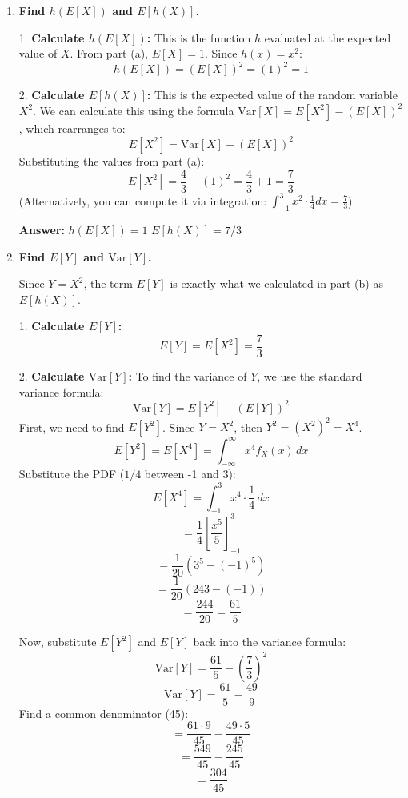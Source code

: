 \documentclass[12pt]{article}
\begin{document}
\begin{enumerate}[label=\textbf{\arabic*.}, leftmargin=*]
\begin{enumerate}[label=(\alph*)]
    \textbf{Variance $\text{Var}[X]$:}
    \[ \text{Var}[X] = \frac{(b - a)^2}{12} = \frac{(3 - (-1))^2}{12} = \frac{4^2}{12} = \frac{16}{12} = \frac{4}{3} \]

    \textbf{Answer:}
    $E[X] = 1$
    $\text{Var}[X] = 4/3$

    \item \textbf{Find $h(E[X])$ and $E[h(X)]$.}

    1. \textbf{Calculate $h(E[X])$:}
    This is the function $h$ evaluated at the expected value of $X$.
    From part (a), $E[X] = 1$.
    Since $h(x) = x^2$:
    \[ h(E[X]) = (E[X])^2 = (1)^2 = 1 \]

    2. \textbf{Calculate $E[h(X)]$:}
    This is the expected value of the random variable $X^2$.
    We can calculate this using the formula $\text{Var}[X] = E[X^2] - (E[X])^2$, which rearranges to:
    \[ E[X^2] = \text{Var}[X] + (E[X])^2 \]
    Substituting the values from part (a):
    \[ E[X^2] = \frac{4}{3} + (1)^2 = \frac{4}{3} + 1 = \frac{7}{3} \]
    (Alternatively, you can compute it via integration: $\int_{-1}^{3} x^2 \cdot \frac{1}{4} dx = \frac{7}{3}$)

    \textbf{Answer:}
    $h(E[X]) = 1$
    $E[h(X)] = 7/3$

    \item \textbf{Find $E[Y]$ and $\text{Var}[Y]$.}

    Since $Y = X^2$, the term $E[Y]$ is exactly what we calculated in part (b) as $E[h(X)]$.

    1. \textbf{Calculate $E[Y]$:}
    \[ E[Y] = E[X^2] = \frac{7}{3} \]

    2. \textbf{Calculate $\text{Var}[Y]$:}
    To find the variance of $Y$, we use the standard variance formula:
    \[ \text{Var}[Y] = E[Y^2] - (E[Y])^2 \]
    First, we need to find $E[Y^2]$.
    Since $Y = X^2$, then $Y^2 = (X^2)^2 = X^4$.
    \[ E[Y^2] = E[X^4] = \int_{-\infty}^{\infty} x^4 f_X(x) \, dx \]
    Substitute the PDF ($1/4$ between -1 and 3):
    \[ E[X^4] = \int_{-1}^{3} x^4 \cdot \frac{1}{4} \, dx \]
    \[ = \frac{1}{4} \left[ \frac{x^5}{5} \right]_{-1}^{3} \]
    \[ = \frac{1}{20} \left( 3^5 - (-1)^5 \right) \]
    \[ = \frac{1}{20} (243 - (-1)) \]
    \[ = \frac{244}{20} = \frac{61}{5} \]

    Now, substitute $E[Y^2]$ and $E[Y]$ back into the variance formula:
    \[ \text{Var}[Y] = \frac{61}{5} - \left( \frac{7}{3} \right)^2 \]
    \[ \text{Var}[Y] = \frac{61}{5} - \frac{49}{9} \]
    Find a common denominator (45):
    \[ = \frac{61 \cdot 9}{45} - \frac{49 \cdot 5}{45} \]
    \[ = \frac{549}{45} - \frac{245}{45} \]
    \[ = \frac{304}{45} \]


\end{enumerate}
\end{enumerate}
\end{document}
